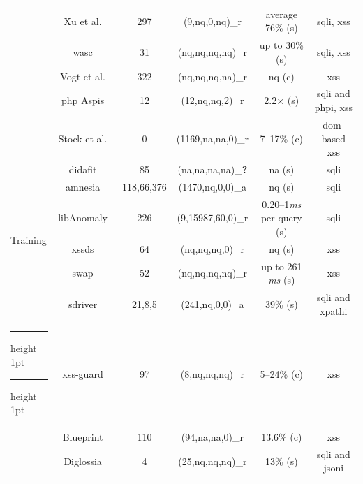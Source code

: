 \documentclass[conference]{IEEEtran}
\makeatletter
\newcommand{\tick}{\ding{52}}
\newcommand{\xmark}{\ding{56}}
\newcommand{\thickhline}{%
    \noalign {\ifnum 0=`}\fi \hrule height 1pt
    \futurelet \reserved@a \@xhline
}
\makeatother
\begin{document}
\begin{table}[t]
\begin{threeparttable}
\begin{small}
{\begin{tabular}{l|c|c|cc|c}
  &   Xu et al.~\cite{XBS06} & 297 & (9,{\sc nq},0,{\sc nq})\_r & average 76\% ({\sc s}) & {\sc sql}i, {\sc xss} \\ 
  &   {\sc wasc}~\cite{NLC07} & 31 & ({\sc nq},{\sc nq},{\sc nq},{\sc nq})\_r & up to 30\% ({\sc s}) & {\sc sql}i, {\sc xss} \\
  &   Vogt et al.~\cite{VFJKKV07} & 322 & ({\sc nq},{\sc nq},{\sc nq},{\sc na})\_r & {\sc nq} ({\sc c}) & {\sc xss} \\
  &   {\sc php} Aspis~\cite{PMP11} & 12 & (12,{\sc nq},{\sc nq},2)\_r & 2.2$\times$ ({\sc s}) & {\sc sql}i and {\sc php}i, {\sc xss} \\
  &   Stock et al.~\cite{SLMS14} & 0 & (1169,{\sc na},{\sc na},0)\_r & 7--17\% ({\sc c}) & {\sc dom}-based {\sc xss} \\
  \hline 
  \multirow{6}{*}{Training}
  &   {\sc didafit}~\cite{LLW02} & 85 & ({\sc na},{\sc na},{\sc na},{\sc na})\_{\bf ?} & {\sc na} ({\sc s}) & {\sc sql}i \\
  &   {\sc amnesia}~\cite{HO05,HO06,HO05b} & 118,66,376 & (1470,{\sc nq},0,0)\_a & {\sc nq} ({\sc s}) & {\sc sql}i \\ 
  &   libAnomaly~\cite{VMV05} & 226 & (9,15987,60,0)\_r & 0.20--1{\it ms} per query ({\sc s}) & {\sc sql}i \\
  &   {\sc xssds}~\cite{JEP08} & 64 & ({\sc nq},{\sc nq},{\sc nq},0)\_r & {\sc nq} ({\sc s}) & {\sc xss} \\
  &   {\sc swap}~\cite{WPLKK09} & 52 & ({\sc nq},{\sc nq},{\sc nq},{\sc nq})\_r & up to 261 {\it ms} ({\sc s}) & {\sc xss} \\ 
  &   {\sc sd}river~\cite{MS09,MKS09,MKLS11} & 21,8,5 & (241,{\sc nq},0,0)\_a & 39\% ({\sc s}) & {\sc sql}i and {\sc xp}athi \\
  \thickhline
  \thickhline
  \multirow{3}{*}{Hybrid}
  &   {\sc xss-guard}~\cite{BV08} & 97 & (8,{\sc nq},{\sc nq},{\sc nq})\_r & 5--24\% ({\sc c}) & {\sc xss} \\
  &   Blueprint~\cite{LV09} & 110 & (94,{\sc na},{\sc na},0)\_r & 13.6\% ({\sc c}) & {\sc xss} \\
  &   Diglossia~\cite{SMS13} & 4 & (25,{\sc nq},{\sc nq},{\sc nq})\_r & 13\% ({\sc s}) & {\sc sql}i and {\sc json}i \\

\end{tabular}}
\end{small}
\end{threeparttable}
\end{table}
\end{document}
